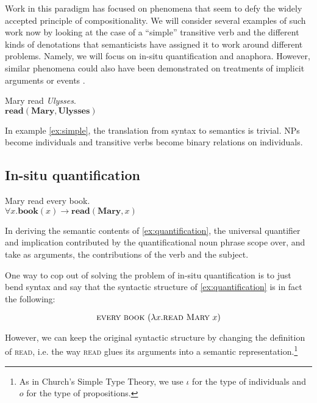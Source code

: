 \documentclass{article}
\begin{document}
Work in this paradigm has focused on phenomena that seem to defy the widely
accepted principle of compositionality. We will consider several examples of
such work now by looking at the case of a ``simple'' transitive verb and the
different kinds of denotations that semanticists have assigned it to work
around different problems. Namely, we will focus on in-situ quantification and
anaphora. However, similar phenomena could also have been demonstrated on
treatments of implicit arguments \citep{blom2012implicit} or events
\citep{qian2011event}.

\begin{exe}
  \ex \label{ex:simple} Mary read \emph{Ulysses}. \\
  $\textbf{read}(\textbf{Mary}, \textbf{Ulysses})$
\end{exe}

In example \eqref{ex:simple}, the translation from syntax to semantics is
trivial. NPs become individuals and transitive verbs become binary relations
on individuals.

\subsection{In-situ quantification}

\begin{exe}
  \ex \label{ex:quantification} Mary read every book. \\
  $\forall x. \textbf{book}(x) \to \textbf{read}(\textbf{Mary}, x)$
\end{exe}

In deriving the semantic contents of \eqref{ex:quantification}, the universal
quantifier and implication contributed by the quantificational noun phrase
scope over, and take as arguments, the contributions of the verb and the
subject.

One way to cop out of solving the problem of in-situ quantification is to just
bend syntax and say that the syntactic structure of \eqref{ex:quantification}
is in fact the following:

$$
\textsc{every} \ \textsc{book} \ (\lambda x. \textsc{read} \ \textsc{Mary} \ x)
$$

However, we can keep the original syntactic structure by changing the
definition of \textsc{read}, i.e. the way \textsc{read} glues its arguments
into a semantic representation.\footnote{As in Church's Simple Type Theory, we
  use $\iota$ for the type of individuals and $o$ for the type of
  propositions.}
\end{document}
